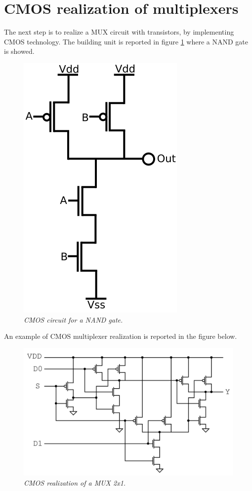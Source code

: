 \section{CMOS realization of multiplexers} 
The next step is to realize a MUX circuit with transistors, by implementing CMOS technology. The building unit is reported in figure \ref{nand2} where a NAND gate is showed.
\begin{figure}[!h]
	\centering
	\includegraphics[scale=0.3]{immagini/nand2.png}
	\caption{\textit{CMOS circuit for a NAND gate.}} 
	\label{nand2}
\end{figure}
\newline
An example of CMOS multiplexer realization is reported in the figure below.
\begin{figure}[!]
	\centering
	\includegraphics[scale=0.22]{immagini/trans}
	\caption{\textit{CMOS realization of a MUX 2x1.}} 
	\label{mux_3}
\end{figure}

